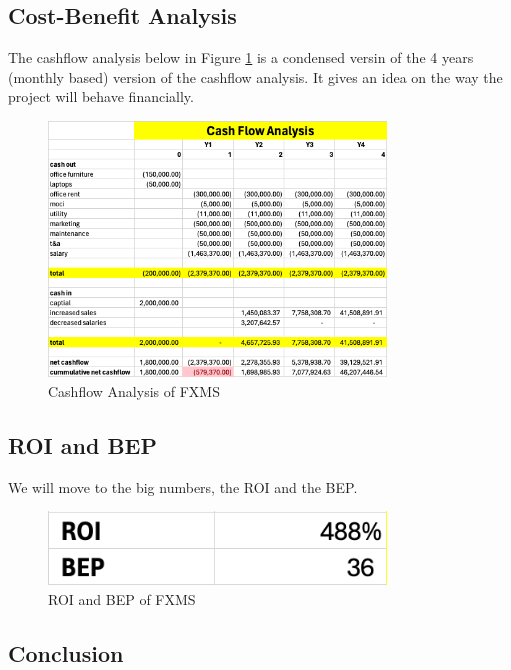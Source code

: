 \documentclass[a4paper]{report}
\begin{document}
\subsection{Cost-Benefit Analysis}

The cashflow analysis below in Figure \ref{fig:cash-flow-analysis} is a condensed versin of the 4 years (monthly based) version of the cashflow analysis. It gives an idea on the way the project will behave financially.

\begin{figure}[h!]
    \centering
    \includegraphics[width=0.8\textwidth]{images/cash-flow-analysis.png}
    \caption{Cashflow Analysis of FXMS}
    \label{fig:cash-flow-analysis}
\end{figure}

\subsection{ROI and BEP}

We will move to the big numbers, the ROI and the BEP.

\begin{figure}[h!]
    \centering
    \includegraphics[width=0.8\textwidth]{images/roi-bep.png}
    \caption{ROI and BEP of FXMS}
    \label{fig:roi-and-bep}
\end{figure}

\subsection{Conclusion}
\end{document}
